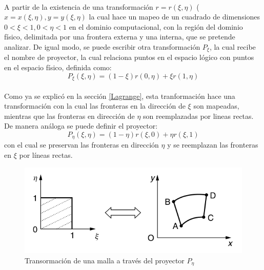 \documentclass[letterpaper, openright, 12pt]{book}
\begin{document}
    \paragraph*{}
        A partir de la existencia de una transformación $r = r(\xi, \eta)$
        ($x = x(\xi, \eta), y = y(\xi, \eta)$ la cual hace un mapeo de un
        cuadrado de dimensiones $0 < \xi < 1, 0 < \eta < 1$ en el dominio
        computacional, con la región del dominio físico, delimitada por una
        frontera externa y una interna, que se pretende analizar.
        De igual modo, se puede escribir otra transformación $P_{\xi}$,
        la cual recibe el nombre de proyector, la cual relaciona puntos en el
        espacio lógico con puntos en el espacio físico, definida como:
        \begin{equation}
            P_{\xi}(\xi, \eta) = (1 - \xi)r(0, \eta) + \xi r(1, \eta)
        \end{equation}
    \paragraph*{}
        Como ya se explicó en la sección \ref{Lagrange}, esta tranformación hace
        una transformación con la cual las fronteras en la dirección de $\xi$
        son mapeadas, mientras que las fronteras en dirección de $\eta$ son
        reemplazadas por lineas rectas. De manera análoga se puede definir el
        proyector:
        \begin{equation}
            P_{\eta}(\xi, \eta) = (1 - \eta)r(\xi, 0) + \eta r(\xi, 1)
        \end{equation}
        con el cual se preservan las fronteras en dirección $\eta$ y se
        reemplazan las fronteras en $\xi$ por líneas rectas.
        \begin{figure}[htbp!]
            \centering
            \includegraphics[width=120mm]{./Imagenes/mapeo_eta}
            \caption[Transformación de malla por $P_{\eta}$]{Transormación de
            una malla a través del proyector $P_{\eta}$ \cite{farrashkhalvat}}
            \label{fig:mapeo_eta}
        \end{figure}
\end{document}

